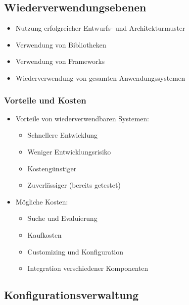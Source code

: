 \documentclass[11pt, a4paper]{article}
\begin{document}
\vspace{10em}

\raggedright \subsection{Wiederverwendungsebenen}

\begin{itemize}
    \item Nutzung erfolgreicher Entwurfs- und Architekturmuster
    \item Verwendung von Bibliotheken
    \item Verwendung von Frameworks
    \item Wiederverwendung von gesamten Anwendungssystemen
\end{itemize}

\newpage

\raggedright \subsubsection{Vorteile und Kosten}

\begin{itemize}
    \item Vorteile von wiederverwendbaren Systemen:
    \begin{itemize}
        \item Schnellere Entwicklung
        \item Weniger Entwicklungsrisiko
        \item Kostengünstiger
        \item Zuverlässiger (bereits getestet)
    \end{itemize}
    \item Mögliche Kosten:
    \begin{itemize}
        \item Suche und Evaluierung
        \item Kaufkosten
        \item Customizing und Konfiguration
        \item Integration verschiedener Komponenten
    \end{itemize}
\end{itemize}


\raggedright \subsection{Konfigurationsverwaltung}
\end{document}
